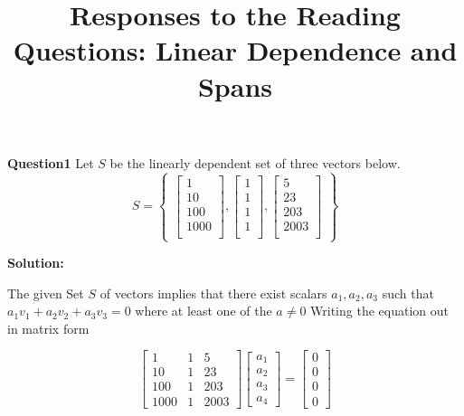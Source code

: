 \documentclass{article}
\title{Responses to the Reading Questions: Linear Dependence and Spans}
\begin{document}
\maketitle

\newcommand{\sol} {
  \textbf{Solution:}
}

\newcommand{\LIVHS} {\textbf{Linearly Independent Vectors and Homogeneous Systems}}

\newcommand{\FVCS} {\textbf{Free Variables for Consistent Systems}}

\newcommand{\HSC} {\textbf{Homogeneous Systems are Consistent}}

\newcommand{\ls} {\(\mathcal{LS}(A,\textbf{0})\)}

\newcommand{\p} {$\boxed{1}$~}

\noindent\textbf{Question1} Let \(S\) be the linearly dependent set of three vectors below.
\[
S=
\begin{Bmatrix}
  \begin{bmatrix}
    1 \\
    10 \\
    100 \\
    1000 \\
  \end{bmatrix}
,
\begin{bmatrix}
  1 \\
  1 \\
  1 \\
  1 \\
\end{bmatrix}
,
\begin{bmatrix}
  5 \\
  23 \\
  203 \\
  2003 \\
\end{bmatrix}
\end{Bmatrix}
\]

\bigskip

\sol

The given Set \(S\) of vectors implies that  there exist scalars \(a_1, a_2, a_3\)
such that \(a_1 v_1 + a_2 v_2 + a_3 v_3 = 0\) where at least one of the \(a \neq 0\)
Writing the equation out in matrix form

\[
\begin{bmatrix}
  1 & 1 & 5 \\
  10 & 1 & 23 \\
  100 & 1 & 203 \\
  1000 & 1 & 2003
\end{bmatrix}
\begin{bmatrix}
  a_1 \\
  a_2 \\
  a_3 \\
  a_4
\end{bmatrix}
=
\begin{bmatrix}
  0 \\
  0 \\
  0 \\
  0
\end{bmatrix}
\]
\end{document}
